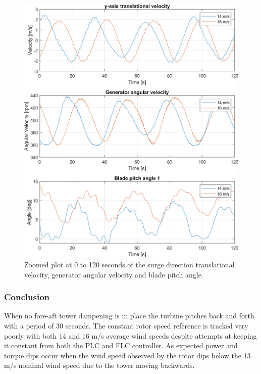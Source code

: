 \begin{figure}[ht]
	\centering
	\includegraphics[width=0.8\linewidth]{Graphics/TestResults/tj02/uykf_omgen_pi1_zoom.png}
	\caption{Zoomed plot at 0 to 120 seconds of the surge direction translational velocity, generator angular velocity and blade pitch angle.}
	\label{fig:tj02_uykf_to_pi1_zoom}
\end{figure}

\subsubsection*{Conclusion}
When no fore-aft tower dampening is in place the turbine pitches back and forth with a period of 30 seconds. The constant rotor speed reference is tracked very poorly with both 14 and 16 m/s average wind speeds despite attempts at keeping it constant from both the PLC and FLC controller. As expected power and torque dips occur when the wind speed observed by the rotor dips below the 13 m/s nominal wind speed due to the tower moving backwards.